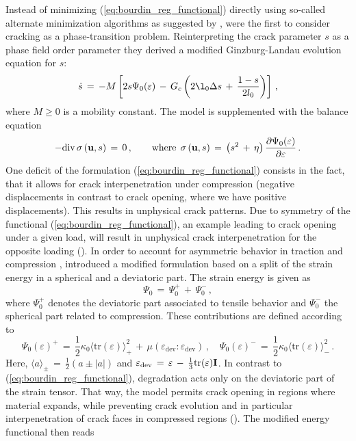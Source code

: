 Instead of minimizing (\ref{eq:bourdin_reg_functional}) directly using so-called alternate minimization algorithms as suggested by \cite{bourd2000}, \cite{kuhn2008phase} were the first to consider cracking as a phase-transition problem. Reinterpreting the crack parameter $s$ as a phase field order parameter they derived a modified Ginzburg-Landau evolution equation for $s$:
\begin{equation}
\label{eq:kuhn_evolution}
\dot s\,=\, - M \left[ 2s\Psi_{0}(\varepsilon)\,-\,G_{c}\left( 2\l_0 \Delta s \,+\, \frac{1-s}{2 l_0}\right) \right]\,,
\end{equation}
where $M\geq0$ is a mobility constant. The model is supplemented with the balance equation
\begin{equation}
\label{eq:kuhn_balance}
- \textrm{div} \,\sigma\left( {\bf u}, s \right)\,=\,0\,, \quad \quad \textrm{where} \:\: \sigma\left( {\bf u}, s \right)\,=\, \left( s^2 \,+\, \eta\right)\frac{\partial \Psi_0({\bf \varepsilon})}{\partial {\bf \varepsilon}}\,.
\end{equation} 
One deficit of the formulation (\ref{eq:bourdin_reg_functional}) consists in the fact, that it allows for crack interpenetration under compression (negative displacements in contrast to crack opening, where we have positive displacements). This results in unphysical crack patterns. Due to symmetry of the functional (\ref{eq:bourdin_reg_functional}), an example leading to crack opening under a given load, will result in unphysical crack interpenetration for the opposite loading (\cite{amor2009regularized}). In order to account for asymmetric behavior in traction and compression \cite{amor2009regularized}, introduced a modified formulation based on a split of the strain energy in a spherical and a deviatoric part. The strain energy is given as \begin{equation}
	\Psi_0\,=\,\Psi_0^{+}\,+\,\Psi_0^{-}\,,
\end{equation}
where $\Psi_0^{+}$ denotes the deviatoric part associated to tensile behavior and $\Psi_0^{-}$ the spherical part related to compression. These contributions are defined according to
\begin{equation}
\Psi_{0}(\varepsilon)^+\,=\, \frac{1}{2} \kappa_0 \langle \textrm{tr}(\varepsilon)\rangle^2_{+}\,+\,\mu\left( \varepsilon_{\textrm{dev}}\colon\varepsilon_{\textrm{dev}} \right)\,, \quad
\Psi_{0}(\varepsilon)^-\,=\,\frac{1}{2} \kappa_0 \langle \textrm{tr}(\varepsilon)\rangle^2_{-}\,.
\end{equation}
Here, $\langle a \rangle_{\pm}\,=\, \frac{1}{2}\left( a\pm |a| \right)$ and $\varepsilon_{\textrm{dev}}\,=\, \varepsilon\,-\,\frac{1}{3}\textrm{tr}(\varepsilon){\bf I}$. In contrast to (\ref{eq:bourdin_reg_functional}), degradation acts only on the deviatoric part of the strain tensor. That way, the model permits crack opening in regions where material expands, while preventing crack evolution and in particular interpenetration of crack faces in compressed regions (\cite{amor2009regularized}). The modified energy functional then reads
